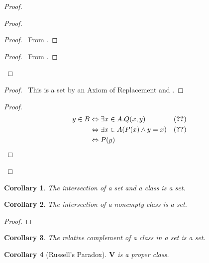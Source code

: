 \documentclass{book}
\let\qed\relax
\newtheorem{cor}{Corollary}[ax]
\theoremstyle{definition}
\begin{document}
\begin{proof}
\pf
{}
\begin{proof}
	\begin{proof}
		\pf\ From .
	\end{proof}
	\begin{proof}
		\pf\ From .
	\end{proof}
\end{proof}
\begin{proof}
	\pf\ This is a set by an Axiom of Replacement and .
\end{proof}
\begin{proof}
	\pf
	\begin{align*}
		y \in B & \Leftrightarrow \exists x \in A. Q(x,y) & (\text{\stepref{4}}) \\
		& \Leftrightarrow \exists x \in A (P(x) \wedge y = x) & (\text{\stepref{2}}) \\
		& \Leftrightarrow P(y)
	\end{align*}
\end{proof}
\qed
\end{proof}

\begin{cor}
The intersection of a set and a class is a set.
\end{cor}

\begin{cor}
The intersection of a nonempty class is a set.
\end{cor}

\begin{proof}
\pf
{}
\qed
\end{proof}

\begin{cor}
The relative complement of a class in a set is a set.
\end{cor}

\begin{cor}[Russell's Paradox]
$\mathbf{V}$ is a proper class.
\end{cor}
\end{document}
